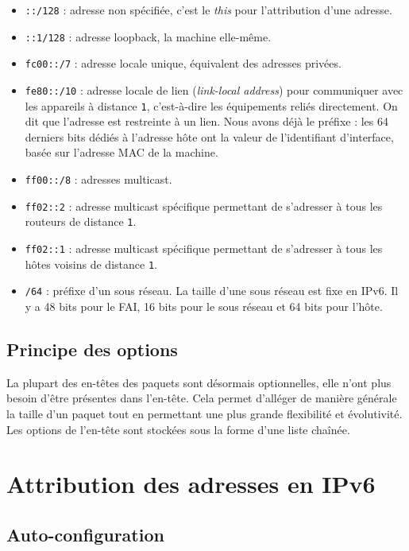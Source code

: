 \begin{itemize}
  \item	\texttt{::/128} : adresse non spécifiée, c’est le \emph{this} pour l’attribution d’une adresse.
  \item	\texttt{::1/128} : adresse loopback, la machine elle-même.
  \item	\texttt{fc00::/7} : adresse locale unique, équivalent des adresses privées.
  \item \texttt{fe80::/10} : adresse locale de lien (\textit{link-local address}) pour communiquer avec les appareils à distance \texttt{1}, c’est-à-dire les équipements reliés directement.
On dit que l’adresse est restreinte à un lien.
Nous avons déjà le préfixe : les 64 derniers bits dédiés à l’adresse hôte ont la valeur de l’identifiant d’interface, basée sur l’adresse MAC de la machine.
  \item \texttt{ff00::/8} : adresses multicast.
  \item \texttt{ff02::2} : adresse multicast spécifique permettant de s’adresser à tous les routeurs de distance \texttt{1}.
  \item \texttt{ff02::1} : adresse multicast spécifique permettant de s’adresser à tous les hôtes voisins de distance \texttt{1}.
  \item \texttt{/64} : préfixe d’un sous réseau. La taille d’une sous réseau est fixe en IPv6.
Il y a 48 bits pour le FAI, 16 bits pour le sous réseau et 64 bits pour l’hôte.
\end{itemize}

\subsection{Principe des options}

La plupart des en-têtes des paquets sont désormais optionnelles, elle n'ont plus besoin d'être présentes dans l'en-tête.
Cela permet d’alléger de manière générale la taille d’un paquet tout en permettant une plus grande flexibilité et évolutivité.
Les options de l’en-tête sont stockées sous la forme d’une liste chaînée.

\newpage
\section{Attribution des adresses en IPv6}

\subsection{Auto-configuration}

